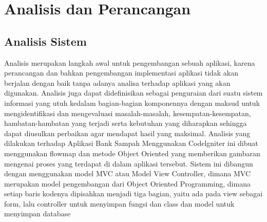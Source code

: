 \section{Analisis dan Perancangan}
\subsection{Analisis Sistem}
Analisis merupakan langkah awal untuk pengembangan sebuah aplikasi, karena perancangan dan bahkan pengembangan implementasi aplikasi tidak akan berjalan dengan baik tanpa adanya analisa terhadap aplikasi yang akan digunakan. Analisis juga dapat didefinisikan sebagai penguraian dari suatu sistem informasi yang utuh kedalam bagian-bagian komponennya dengan maksud untuk mengidentifikasi dan mengevaluasi masalah-masalah, kesempatan-kesempatan, hambatan-hambatan yang terjadi serta kebutuhan yang diharapkan sehingga dapat diusulkan perbaikan agar mendapat hasil yang maksimal. 
Analisis yang dilakukan terhadap Aplikasi Bank Sampah Menggunakan Codelgniter ini dibuat menggunakan flowmap dan metode Object Oriented yang memberikan gambaran mengenai proses yang terdapat di dalam aplikasi tersebut. 
Sistem ini dibangun dengan menggunakan model MVC atau Model View Controller, dimana MVC merupakan  model pengembangan dari Object Oriented Programming, dimana setiap baris kodenya dipisahkan menjadi tiga bagian, yaitu ada pada view sebagai form, lalu controller untuk menyimpan fungsi dan class dan model untuk menyimpan database

